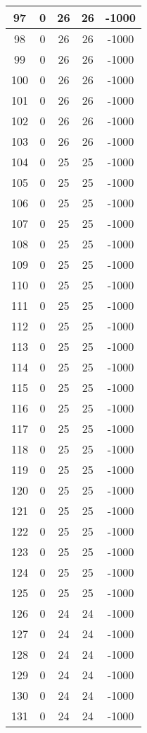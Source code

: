 \documentclass[letterpaper, 12pt]{article}
\begin{document}
\begin{longtable}{|c|c|c|c|c|}
\hline
97 & 0 & 26 & 26 & -1000 \\
\hline
98 & 0 & 26 & 26 & -1000 \\
\hline
99 & 0 & 26 & 26 & -1000 \\
\hline
100 & 0 & 26 & 26 & -1000 \\
\hline
101 & 0 & 26 & 26 & -1000 \\
\hline
102 & 0 & 26 & 26 & -1000 \\
\hline
103 & 0 & 26 & 26 & -1000 \\
\hline
104 & 0 & 25 & 25 & -1000 \\
\hline
105 & 0 & 25 & 25 & -1000 \\
\hline
106 & 0 & 25 & 25 & -1000 \\
\hline
107 & 0 & 25 & 25 & -1000 \\
\hline
108 & 0 & 25 & 25 & -1000 \\
\hline
109 & 0 & 25 & 25 & -1000 \\
\hline
110 & 0 & 25 & 25 & -1000 \\
\hline
111 & 0 & 25 & 25 & -1000 \\
\hline
112 & 0 & 25 & 25 & -1000 \\
\hline
113 & 0 & 25 & 25 & -1000 \\
\hline
114 & 0 & 25 & 25 & -1000 \\
\hline
115 & 0 & 25 & 25 & -1000 \\
\hline
116 & 0 & 25 & 25 & -1000 \\
\hline
117 & 0 & 25 & 25 & -1000 \\
\hline
118 & 0 & 25 & 25 & -1000 \\
\hline
119 & 0 & 25 & 25 & -1000 \\
\hline
120 & 0 & 25 & 25 & -1000 \\
\hline
121 & 0 & 25 & 25 & -1000 \\
\hline
122 & 0 & 25 & 25 & -1000 \\
\hline
123 & 0 & 25 & 25 & -1000 \\
\hline
124 & 0 & 25 & 25 & -1000 \\
\hline
125 & 0 & 25 & 25 & -1000 \\
\hline
126 & 0 & 24 & 24 & -1000 \\
\hline
127 & 0 & 24 & 24 & -1000 \\
\hline
128 & 0 & 24 & 24 & -1000 \\
\hline
129 & 0 & 24 & 24 & -1000 \\
\hline
130 & 0 & 24 & 24 & -1000 \\
\hline
131 & 0 & 24 & 24 & -1000 \\

\end{longtable}
\end{document}
